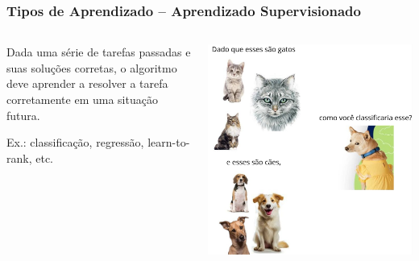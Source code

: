 \begin{frame}
    \frametitle{Tipos de Aprendizado – Aprendizado Supervisionado}
    \begin{columns} 
        \begin{flushleft}
            Dada uma série de tarefas passadas e suas soluções corretas, o algoritmo deve aprender a resolver a tarefa corretamente em uma situação futura.

            Ex.: classificação, regressão, learn-to-rank, etc. 
                   
        \end{flushleft}
        \begin{center}
        \includegraphics[height=0.6\paperheight]{./imgs/fig6-supervised.jpg}
        \end{center}
    \end{columns}
\end{frame}


